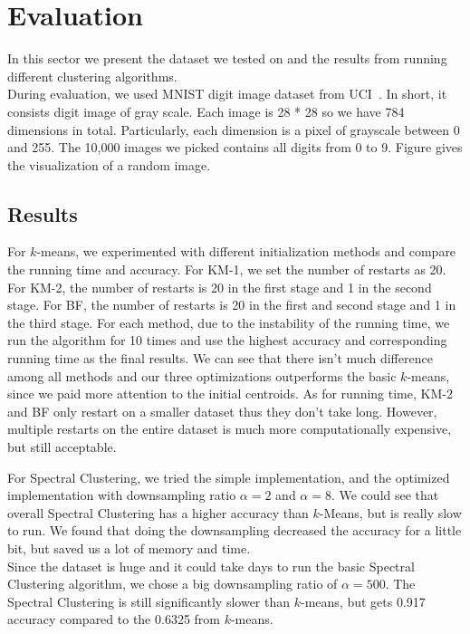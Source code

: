 \documentclass{acm_proc_article-sp}
\begin{document}
\section{Evaluation}
In this sector we present the dataset we tested on and the results from running different clustering algorithms.\\
During evaluation, we used MNIST digit image dataset from UCI~\cite{Lichman:2013}. In short, it consists digit image of gray scale. Each image is 28 * 28 so we have 784 dimensions in total. Particularly, each dimension is a pixel of grayscale between 0 and 255. The 10,000 images we picked contains all digits from 0 to 9. Figure gives the visualization of a random image.

\subsection{Results}


For $k$-means, we experimented with different initialization methods and compare the running time and accuracy. For KM-1, we set the number of restarts as 20. For KM-2, the number of restarts is 20 in the first stage and 1 in the second stage. For BF, the number of restarts is 20 in the first and second stage and 1 in the third stage. For each method, due to the instability of the running time, we run the algorithm for 10 times and use the highest accuracy and corresponding running time as the final results. We can see that there isn't much difference among all methods and our three optimizations outperforms the basic $k$-means, since we paid more attention to the initial centroids. As for running time, KM-2 and BF only restart on a smaller dataset thus they don't take long. However, multiple restarts on the entire dataset is much more computationally expensive, but still acceptable.

For Spectral Clustering, we tried the simple implementation, and the optimized implementation with downsampling ratio $\alpha=2$ and $\alpha=8$. We could see that overall Spectral Clustering has a higher accuracy than $k$-Means, but is really slow to run. We found that doing the downsampling decreased the accuracy for a little bit, but saved us a lot of memory and time.\\


Since the dataset is huge and it could take days to run the basic Spectral Clustering algorithm, we chose a big downsampling ratio of $\alpha = 500$. The Spectral Clustering is still significantly slower than $k$-means, but gets 0.917 accuracy compared to the 0.6325 from $k$-means.
\end{document}

